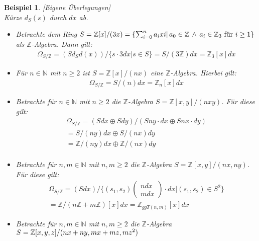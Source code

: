 \documentclass[10pt,a4paper]{report}
\newcommand{\comment}[1]{}
\newcounter{Aussage}[chapter]
\newtheorem{bsp}[Aussage]{Beispiel}
\newcommand{\divR}[2]{\Omega_{#1/#2}}
\newcommand{\divf}[1]{d_{#1}}
\begin{document}
\begin{bsp}\comment{\label{Bsp Moduloraeume}} \textit{[Eigene Überlegungen]}\\
Kürze $\divf{S}(s)$ durch $dx$ ab.
\begin{itemize}
\item Betrachte dem Ring $S = \mathbb{Z}[x]/(3x) = \lbrace \nolinebreak{\sum_{i = 0}^n a_i xi \vert \, a_0 \in \mathbb{Z} \, \wedge \, a_i \in \mathbb{Z}_3 \text{ für } i \geq 1 \rbrace}$ als $\mathbb{Z}$-Algebra. Dann gilt:
\begin{gather*}
\divR{S}{\mathbb{Z}} = \left( S\divf{S}d(x) \right)/\lbrace s \cdot 3dx \vert s \in S \rbrace = S/(3\mathbb{Z}) dx = \mathbb{Z}_3[x] dx
\end{gather*}

\item Für $n \in \mathbb{N}$ mit $n \geq 2$ ist $S = \mathbb{Z}[x]/(nx)$ eine $\mathbb{Z}$-Algebra. Hierbei gilt:
\begin{gather*}
\divR{S}{\mathbb{Z}} = S/(n) dx = \mathbb{Z}_n[x] dx
\end{gather*}

\item Betrachte für $n \in \mathbb{N}$ mit $n \geq 2$ die $\mathbb{Z}$-Algebra $S = \mathbb{Z}[x,y]/(nxy)$. Für diese gilt:
\begin{gather*}
\divR{S}{\mathbb{Z}}
= (S dx \oplus S dy) / (Sny \cdot dx \oplus Snx \cdot dy)\\
= S/(ny)dx \oplus S/(nx)dy\\
= \mathbb{Z}/(ny)dx \oplus \mathbb{Z}/(nx) dy\\\
\end{gather*}

\item Betrachte für $n,m \in \mathbb{N}$ mit $n,m \geq 2$ die $\mathbb{Z}$-Algebra $S = \mathbb{Z}[x,y]/(nx,ny)$. Für diese gilt:
\begin{gather*}
\divR{S}{\mathbb{Z}}
= (S dx)/\lbrace (s_1,s_2)
\begin{pmatrix}
ndx\\
mdx
\end{pmatrix}
 \cdot dx \vert (s_1,s_2) \in S^2 \rbrace \\
= \mathbb{Z}/(n\mathbb{Z} + m\mathbb{Z})[x]dx 
= \mathbb{Z}_{ggT(n,m)}[x]dx
\end{gather*}

\item Betrachte für $n,m \in \mathbb{N}$ mit $n,m \geq 2$ die $\mathbb{Z}$-Algebra $S = \nolinebreak{\mathbb{Z}[x,y,z]/(nx + ny, mx + mz, mz^2)}$
\end{itemize}
\end{bsp}
\end{document}

